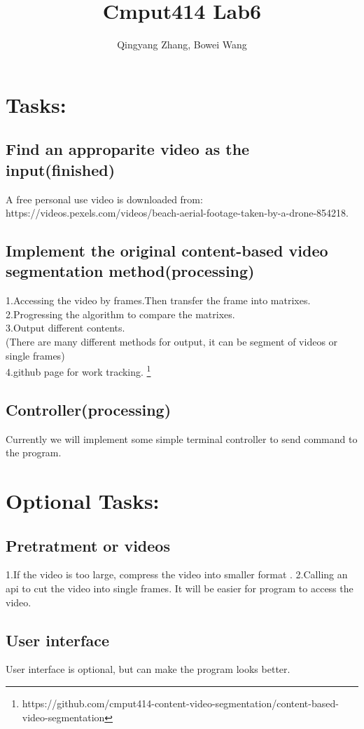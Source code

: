 \documentclass[11pt]{article} %
\title{Cmput414 Lab6}
\author{Qingyang Zhang, Bowei Wang}
\begin{document}
\maketitle

\section{Tasks:}



\subsection{Find an approparite video as the input(finished)}
A free personal use video is downloaded from:\\ https://videos.pexels.com/videos/beach-aerial-footage-taken-by-a-drone-854218.
\subsection{Implement the original content-based video segmentation method(processing)}
1.Accessing the video by frames.Then transfer the frame into matrixes.\\
2.Progressing the algorithm to compare the matrixes.\\
3.Output different contents. \\
(There are many different methods for output, it can be segment of videos or single frames)\\
4.github page for work tracking.
\footnote{https://github.com/cmput414-content-video-segmentation/content-based-video-segmentation}
\subsection{Controller(processing)}
Currently we will implement some simple terminal controller to send command to the program.


\section{Optional Tasks:}
\subsection{Pretratment or videos}
1.If the video is too large, compress the video into smaller format .
2.Calling an api to cut the video into single frames. It will be easier for program to access the video.

\subsection{User interface}
User interface is optional, but can make the program looks better.
\end{document}
